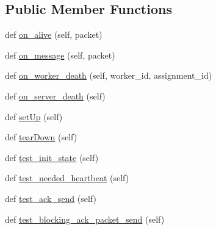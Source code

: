 \subsection*{Public Member Functions}
\begin{DoxyCompactItemize}
\item 
def \hyperlink{classparlai_1_1mturk_1_1core_1_1legacy__2018_1_1test_1_1test__socket__manager_1_1TestSocketManagerRoutingFunctionality_af4209c0323e9ebd02921a7686fe63126}{on\+\_\+alive} (self, packet)
\item 
def \hyperlink{classparlai_1_1mturk_1_1core_1_1legacy__2018_1_1test_1_1test__socket__manager_1_1TestSocketManagerRoutingFunctionality_a11ee265cc64ea411e8f12800cfacef6c}{on\+\_\+message} (self, packet)
\item 
def \hyperlink{classparlai_1_1mturk_1_1core_1_1legacy__2018_1_1test_1_1test__socket__manager_1_1TestSocketManagerRoutingFunctionality_ae690e0129f59380bd90b1418a97cd9b8}{on\+\_\+worker\+\_\+death} (self, worker\+\_\+id, assignment\+\_\+id)
\item 
def \hyperlink{classparlai_1_1mturk_1_1core_1_1legacy__2018_1_1test_1_1test__socket__manager_1_1TestSocketManagerRoutingFunctionality_ace99b0f0707dd9111791675f1ff6e52d}{on\+\_\+server\+\_\+death} (self)
\item 
def \hyperlink{classparlai_1_1mturk_1_1core_1_1legacy__2018_1_1test_1_1test__socket__manager_1_1TestSocketManagerRoutingFunctionality_aed1f1bc8441f53a00d6b9bccc49c1563}{set\+Up} (self)
\item 
def \hyperlink{classparlai_1_1mturk_1_1core_1_1legacy__2018_1_1test_1_1test__socket__manager_1_1TestSocketManagerRoutingFunctionality_a722955a473506927b3f7897086165931}{tear\+Down} (self)
\item 
def \hyperlink{classparlai_1_1mturk_1_1core_1_1legacy__2018_1_1test_1_1test__socket__manager_1_1TestSocketManagerRoutingFunctionality_aed36a73c559aba644ea75bc934fe4459}{test\+\_\+init\+\_\+state} (self)
\item 
def \hyperlink{classparlai_1_1mturk_1_1core_1_1legacy__2018_1_1test_1_1test__socket__manager_1_1TestSocketManagerRoutingFunctionality_accadf3cf8227495252f6ffe440cb7528}{test\+\_\+needed\+\_\+heartbeat} (self)
\item 
def \hyperlink{classparlai_1_1mturk_1_1core_1_1legacy__2018_1_1test_1_1test__socket__manager_1_1TestSocketManagerRoutingFunctionality_aada9dcc1710b1f871de6d1ba1da45d51}{test\+\_\+ack\+\_\+send} (self)
\item 
def \hyperlink{classparlai_1_1mturk_1_1core_1_1legacy__2018_1_1test_1_1test__socket__manager_1_1TestSocketManagerRoutingFunctionality_a4e114545ebb3f735121b648465955a6c}{test\+\_\+blocking\+\_\+ack\+\_\+packet\+\_\+send} (self)

\end{DoxyCompactItemize}
